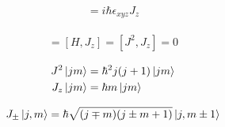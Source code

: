 





{\Huge

\begin{align*}
[J_x,J_y]=i\hbar\epsilon_{xyz}J_z
\end{align*}

\begin{align*}
[H,J^2] = [H,J_z] = [J^2,J_z] = 0
\end{align*}


\begin{align*}
  J^2\left| jm \right\rangle &= \hbar^2j(j+1)\left| jm \right\rangle\\
  J_z\left| jm \right\rangle &= \hbar m\left| jm \right\rangle
\end{align*}


\begin{align*}
   J_{\pm}\left| j,m \right\rangle=\hbar\sqrt{(j\mp m)(j\pm m+1)}\left| j,m\pm 1 \right\rangle
\end{align*}

}%



